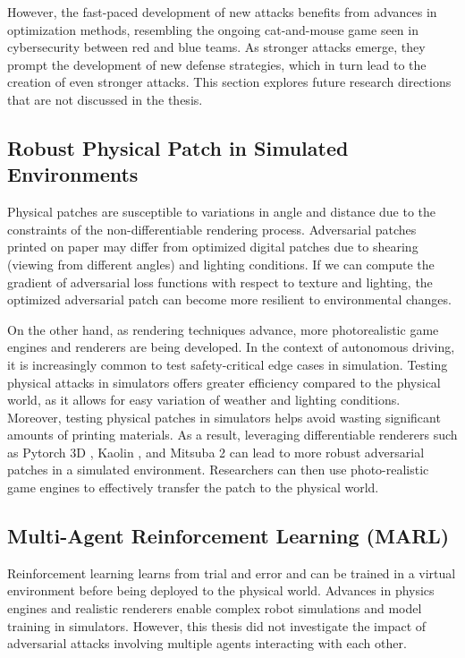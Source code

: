 However, the fast-paced development of new attacks benefits from advances in optimization methods, resembling the ongoing cat-and-mouse game seen in cybersecurity between red and blue teams. As stronger attacks emerge, they prompt the development of new defense strategies, which in turn lead to the creation of even stronger attacks. This section explores future research directions that are not discussed in the thesis.

\subsection{Robust Physical Patch in Simulated Environments}

Physical patches are susceptible to variations in angle and distance due to the constraints of the non-differentiable rendering process. Adversarial patches printed on paper may differ from optimized digital patches due to shearing (viewing from different angles) and lighting conditions. If we can compute the gradient of adversarial loss functions with respect to texture and lighting, the optimized adversarial patch can become more resilient to environmental changes. 

On the other hand, as rendering techniques advance, more photorealistic game engines and renderers are being developed. In the context of autonomous driving, it is increasingly common to test safety-critical edge cases in simulation. Testing physical attacks in simulators offers greater efficiency compared to the physical world, as it allows for easy variation of weather and lighting conditions. Moreover, testing physical patches in simulators helps avoid wasting significant amounts of printing materials. As a result, leveraging differentiable renderers such as Pytorch 3D \citep{ravi2020pytorch3d}, Kaolin \citep{KaolinLibrary}, and Mitsuba 2 \citep{nimier2019mitsuba} can lead to more robust adversarial patches in a simulated environment. Researchers can then use photo-realistic game engines to effectively transfer the patch to the physical world.

\subsection{Multi-Agent Reinforcement Learning (MARL)}

Reinforcement learning learns from trial and error and can be trained in a virtual environment before being deployed to the physical world. Advances in physics engines and realistic renderers enable complex robot simulations and model training in simulators. However, this thesis did not investigate the impact of adversarial attacks involving multiple agents interacting with each other.

